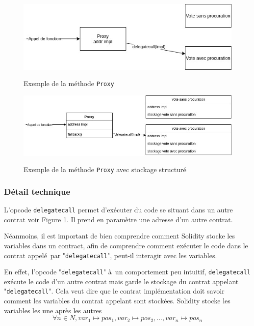 \begin{figure}[t!]
  \caption{Exemple de la méthode \texttt{Proxy}}
  \includegraphics[scale=0.6]{proxy.jpg}
  \centering 
  \label{fig:proxy}
\end{figure}


\begin{figure}[!b!]
  \caption{Exemple de la méthode \texttt{Proxy} avec stockage structuré}
  \includegraphics[scale=0.5]{proxy_structured_stockage.jpg}
  \centering 
  \label{fig:proxy_structure}
\end{figure}



\subsubsection{Détail technique}
L'opcode \texttt{delegatecall} permet d'exécuter du code se situant dans un autre contrat voir Figure \ref{fig:proxy}.  Il prend en paramètre une adresse d'un autre contrat.

Néanmoins, il est important de bien comprendre comment Solidity stocke les variables dans un contract, afin de 
comprendre comment  exécuter le code dans le contrat appelé par "\texttt{delegatecall}", peut-il interagir avec les variables.

En effet, l'opcode "\texttt{delegatecall}" à un comportement peu intuitif, \texttt{delegatecall} exécute le code d'un autre contrat mais garde le stockage du contrat appelant "\texttt{delegatecall}". Cela veut dire que le contrat implémentation doit savoir comment les variables du contrat appelant sont stockées.
%
Solidity stocke les variables les une après les autres 
%
$$\forall n \in N, var_1 \mapsto pos_1, var_2 \mapsto pos_2,
..., var_n \mapsto pos_n$$

